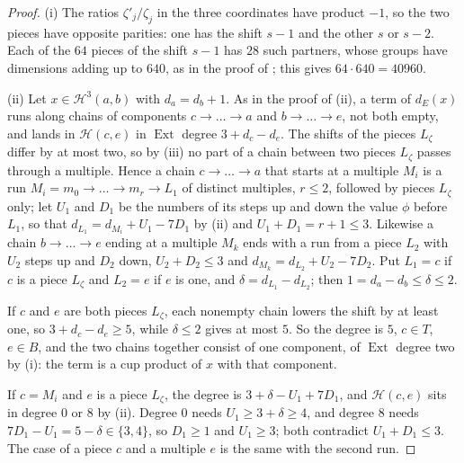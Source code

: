 \documentclass[11pt,reqno]{amsart}
\theoremstyle{plain}
\theoremstyle{definition}
\theoremstyle{remark}
\newcommand{\cH}{\mathcal{H}}
\DeclareMathOperator{\Ext}{Ext}
\begin{document}
\begin{proof}
(i) The ratios $\zeta'_{j}/\zeta_{j}$ in the three coordinates have
product $-1$, so the two pieces have opposite parities: one has the shift
$s-1$ and the other $s$ or $s-2$. Each of the $64$ pieces of the shift $s-1$
has $28$ such partners, whose groups have dimensions adding up to $640$, as
in the proof of ; this gives $64\cdot640=40960$.

(ii) Let $x\in\cH^{3}(a,b)$ with $d_{a}=d_{b}+1$. As in the proof of
(ii), a term of $d_{E}(x)$ runs along chains of
components $c\to\dots\to a$ and $b\to\dots\to e$, not both empty, and lands
in $\cH(c,e)$ in $\Ext$ degree $3+d_{c}-d_{e}$. The shifts of the pieces
$L_{\zeta}$ differ by at most two, so by (iii) no part
of a chain between two pieces $L_{\zeta}$ passes through a multiple. Hence a
chain $c\to\dots\to a$ that starts at a multiple $M_{i}$ is a run
$M_{i}=m_{0}\to\dots\to m_{r}\to L_{1}$ of distinct multiples, $r\le2$,
followed by pieces $L_{\zeta}$ only; let $U_{1}$ and $D_{1}$ be the numbers
of its steps up and down the value $\phi$ before $L_{1}$, so that
$d_{L_{1}}=d_{M_{i}}+U_{1}-7D_{1}$ by (ii) and
$U_{1}+D_{1}=r+1\le3$. Likewise a chain $b\to\dots\to e$ ending at a multiple
$M_{k}$ ends with a run from a piece $L_{2}$ with $U_{2}$ steps up and $D_{2}$
down, $U_{2}+D_{2}\le3$ and $d_{M_{k}}=d_{L_{2}}+U_{2}-7D_{2}$. Put
$L_{1}=c$ if $c$ is a piece $L_{\zeta}$ and $L_{2}=e$ if $e$ is one, and
$\delta=d_{L_{1}}-d_{L_{2}}$; then $1=d_{a}-d_{b}\le\delta\le2$.

If $c$ and $e$ are both pieces $L_{\zeta}$, each nonempty chain lowers the
shift by at least one, so $3+d_{c}-d_{e}\ge5$, while $\delta\le2$ gives at
most $5$. So the degree is $5$, $c\in T$, $e\in B$, and the two chains
together consist of one component, of $\Ext$ degree two by
(i): the term is a cup product of $x$ with that
component.

If $c=M_{i}$ and $e$ is a piece $L_{\zeta}$, the degree is
$3+\delta-U_{1}+7D_{1}$, and $\cH(c,e)$ sits in degree $0$ or $8$ by
(ii). Degree $0$ needs $U_{1}\ge3+\delta\ge4$, and
degree $8$ needs $7D_{1}-U_{1}=5-\delta\in\{3,4\}$, so $D_{1}\ge1$ and
$U_{1}\ge3$; both contradict $U_{1}+D_{1}\le3$. The case of a piece $c$ and
a multiple $e$ is the same with the second run.


\end{proof}
\end{document}
